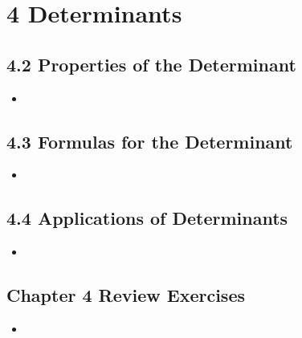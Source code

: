 \chapter{4 Determinants}

\section{4.2 Properties of the Determinant}
\begin{itemize}
  \item []


\end{itemize}

\section{4.3 Formulas for the Determinant}
\begin{itemize}
  \item []


\end{itemize}

\section{4.4 Applications of Determinants}
\begin{itemize}
  \item []


\end{itemize}

\section{Chapter 4 Review Exercises}
\begin{itemize}
  \item []


\end{itemize}


